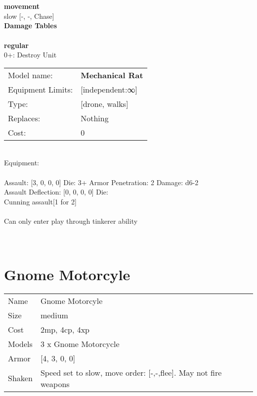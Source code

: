 \noindent \\ 


\ \\ {\bf movement } \\
slow [-, -, Chase] \\


{\bf Damage Tables} \\
\ \\ {\bf regular } \\
0+: Destroy Unit \\


\noindent
\begin{tabular}{ll}
Model name: &{\bf Mechanical Rat } \\
Equipment Limits: &[independent:∞] \\
Type: &[drone, walks] \\
Replaces: &Nothing \\
Cost: & 0\\
\end{tabular}
\ \\
Equipment:  \\
\ \\
Assault: [3, 0, 0, 0] Die: 3+ Armor Penetration: 2 Damage: d6-2 \\
Assault Deflection: [0, 0, 0, 0] Die: \\
\indent Cunning assault[1 for 2]\\ 
 
\ \\
Can only enter play through tinkerer ability\\ 

\ \\
 
\ \\













\clearpage

\section{ Gnome Motorcyle }

\begin{tabular}{ll}
  Name & Gnome Motorcyle \\
  Size & medium\\
  Cost & 2mp, 4cp, 4xp\\
  Models & 3 x Gnome Motorcycle\\
  Armor & [4, 3, 0, 0]\\
  Shaken & Speed set to slow, move order: [-,-,flee]. May not fire weapons\\
\end{tabular}

